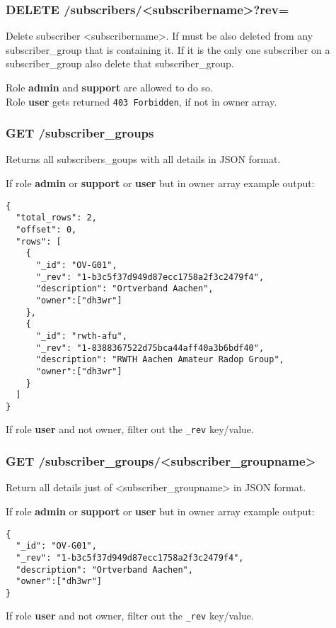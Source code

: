 \subsubsection{DELETE /subscribers/<subscribername>?rev=}
Delete subscriber <subscribername>. If must be also deleted from any subscriber\_group that is containing it. If it is the only one subscriber on a subscriber\_group also delete that subscriber\_group.

Role \textbf{admin} and \textbf{support} are allowed to do so.\\
Role \textbf{user} gets returned \verb|403 Forbidden|, if not in owner array.

\subsubsection{GET /subscriber\_groups}
Returns all subscribers\_goups with all details in JSON format.

If role \textbf{admin} or \textbf{support} or \textbf{user} but in owner array example output:
\begin{lstlisting}
{
  "total_rows": 2,
  "offset": 0,
  "rows": [
    {
      "_id": "OV-G01",
      "_rev": "1-b3c5f37d949d87ecc1758a2f3c2479f4",
      "description": "Ortverband Aachen",
      "owner":["dh3wr"]
    },
    {
      "_id": "rwth-afu",
      "_rev": "1-8388367522d75bca44aff40a3b6bdf40",
      "description": "RWTH Aachen Amateur Radop Group",
      "owner":["dh3wr"]
    }
  ]
}
\end{lstlisting}

If role \textbf{user} and not owner, filter out the \verb|_rev| key/value. 

\subsubsection{GET /subscriber\_groups/<subscriber\_groupname>}
\label{protocoldef:microservicesapi:database:getsubscribergroupname}
Return all details just of <subscriber\_groupname> in JSON format.

If role \textbf{admin} or \textbf{support} or \textbf{user} but in owner array example output:
\begin{lstlisting}
{
  "_id": "OV-G01",
  "_rev": "1-b3c5f37d949d87ecc1758a2f3c2479f4",
  "description": "Ortverband Aachen",
  "owner":["dh3wr"]
}
\end{lstlisting}

If role \textbf{user} and not owner, filter out the \verb|_rev| key/value. 

